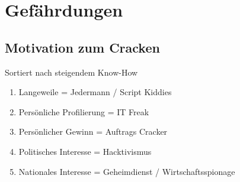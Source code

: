 \section{Gefährdungen}
\subsection{Motivation zum Cracken}
Sortiert nach steigendem Know-How
\begin{enumerate}
	\item Langeweile = Jedermann / Script Kiddies
	\item Persönliche Profilierung = IT Freak
	\item Persönlicher Gewinn = Auftrags Cracker
	\item Politisches Interesse = Hacktivismus
	\item Nationales Interesse = Geheimdienst / Wirtschaftsspionage
\end{enumerate}

